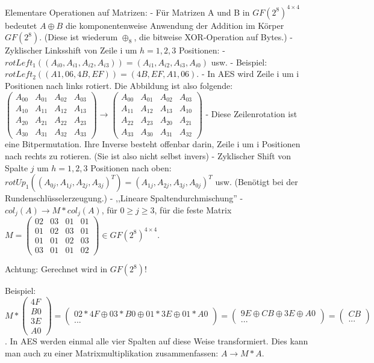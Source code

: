 \documentclass[a4paper]{article}
\begin{document}
\begin{multicols}{3}
Elementare Operationen auf Matrizen:
- Für Matrizen A und B in $GF(2^8)^{4\times 4}$ bedeutet $A\oplus B$ die komponentenweise Anwendung der Addition im Körper $GF(2^8)$. (Diese ist wiederum $\oplus_8$, die bitweise XOR-Operation auf Bytes.)
- Zyklischer Linksshift von Zeile i um $h=1,2,3$ Positionen:
  - $rotLeft_1((A_{i0}, A_{i1}, A_{i2}, A_{i3})) =(A_{i1}, A_{i2}, A_{i3}, A_{i0})$ usw.
  - Beispiel: $rotLeft_2((A1,06,4B,EF)) = (4B,EF,A1,06)$.
  - In AES wird Zeile i um i Positionen nach links rotiert. Die Abbildung ist also folgende: $\begin{pmatrix} A_{00}& A_{01}& A_ {02}& A_{03}\\ A_{10}& A_{11}& A_{12}& A_{13}\\ A_{20}& A_{21}& A_{22}& A_{23}\\ A_{30}& A_{31}& A_{32}& A_{33}\end{pmatrix} \rightarrow \begin{pmatrix} A_{00}& A_{01}& A_{02}& A_{03}\\ A_{11}& A_{12}& A_{13}& A_{10}\\ A_{22}& A_{23}& A_{20}& A_{21}\\ A_{33}& A_{30}& A_{31}& A_{32}\end{pmatrix}$
  - Diese Zeilenrotation ist eine Bitpermutation. Ihre Inverse besteht offenbar darin, Zeile i um i Positionen nach rechts zu rotieren. (Sie ist also nicht selbst invers)
- Zyklischer Shift von Spalte $j$ um $h=1,2,3$ Positionen nach oben: $rotUp_1((A_{0j},A_{1j},A_{2j},A_{3j})^T) = (A_{1j},A_{2j},A_{3j},A_{0j})^T$ usw. (Benötigt bei der Rundenschlüsselerzeugung.)
-  ,,Lineare Spaltendurchmischung'' 
  - $col_j(A) \rightarrow M*col_j(A)$, für $0\geq j\geq 3$, für die feste Matrix $M=\begin{pmatrix} 02& 03& 01& 01\\ 01& 02& 03& 01\\ 01& 01& 02& 03\\ 03& 01& 01& 02\end{pmatrix}\in GF(2^8)^{4\times 4}$.

Achtung: Gerechnet wird in $GF(2^8)$!

Beispiel: $M*\begin{pmatrix} 4F\\ B0\\ 3E\\ A0\end{pmatrix} = \begin{pmatrix} 02*4F\oplus 03*B0\oplus 01*3E\oplus 01*A0\\ ... \end{pmatrix} = \begin{pmatrix} 9E\oplus CB\oplus 3E\oplus A0 \\ ... \end{pmatrix} = \begin{pmatrix} CB\\...\end{pmatrix}$.
In AES werden einmal alle vier Spalten auf diese Weise transformiert. Dies kann man auch zu einer Matrixmultiplikation zusammenfassen: $A \rightarrow M*A$.


\end{multicols}
\end{document}
